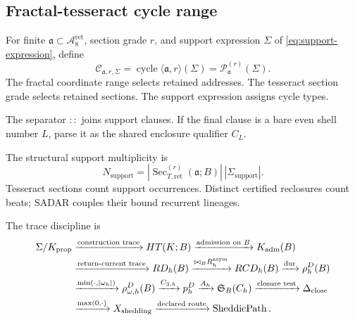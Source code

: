 \subsection{Fractal-tesseract cycle range}
\label{subsec:fractal-tesseract-cycle-range}
For finite \(\mathfrak a\subset\mathcal A^{\mathrm{ret}}_8\), section grade
\(r\), and support expression \(\Sigma\) of \eqref{eq:support-expression}, define
\begin{equation}
\mathcal C_{\mathfrak a,r,\Sigma}
=
\operatorname{cycle}\langle\mathfrak a,r\rangle(\Sigma)
=
\mathcal P^{(r)}_{\mathfrak a}(\Sigma).
\label{eq:fractal-tesseract-cycle-range}
\end{equation}
The fractal coordinate range selects retained addresses. The tesseract section grade selects retained sections. The support expression assigns cycle types.

The separator \(::\) joins support clauses. If the final clause is a bare even
shell number \(L\), parse it as the shared enclosure qualifier \(C_L\).

The structural support multiplicity is
\begin{equation}
N_{\mathrm{support}}
=
|\operatorname{Sec}^{(r)}_{T,\mathrm{ret}}(\mathfrak a;B)|\,|\Sigma_{\mathrm{support}}|.
\label{eq:beat-count}
\end{equation}
Tesseract sections count support occurrences. Distinct certified reclosures count beats; SADAR couples their bound recurrent lineages.

The trace discipline is
\begin{equation}
\begin{aligned}
\Sigma/K_{\mathrm{prop}}
&\xrightarrow{\text{construction trace}}
HT(K;B)
\xrightarrow{\text{admission on }B}
K_{\mathrm{adm}}(B)\\
&\xrightarrow{\text{return-current trace}}
RD_h(B)
\xrightarrow{\bowtie_B R^{\mathrm{asym}}_h}
RCD_h(B)
\xrightarrow{\operatorname{dur}}
\rho_h^D(B)\\
&\xrightarrow{\min(\cdot,|\omega_h|)}
\rho^D_{\omega,h}(B)
\xrightarrow{C_{3,h}}
p_h^D
\xrightarrow{A_h}
\mathfrak S_B(C_h)
\xrightarrow{\text{closure test}}
\Delta_{\mathrm{close}}\\
&\xrightarrow{\max(0,\cdot)}
X_{\mathrm{shedding}}
\xrightarrow{\text{declared route}}
\operatorname{SheddicPath}.
\end{aligned}
\label{eq:support-trace-spine}
\end{equation}
